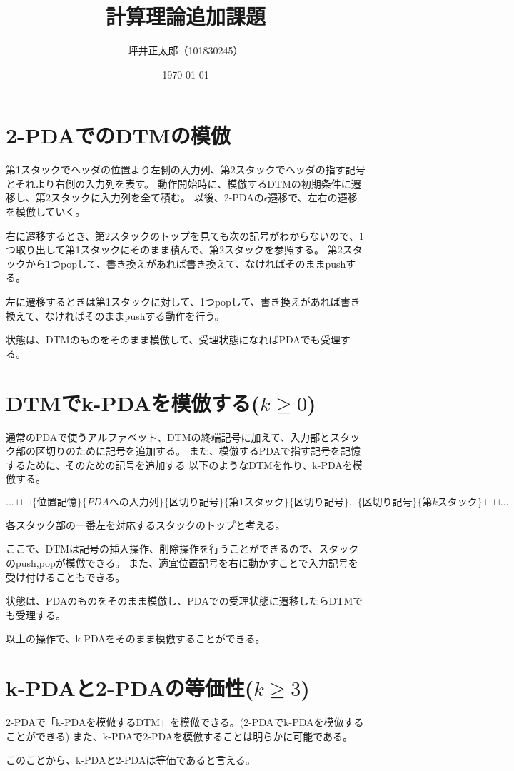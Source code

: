 \documentclass[a4paper,10pt]{jsarticle}
\begin{document}
\title{計算理論追加課題}
\author{坪井正太郎（101830245）}
\date{\today}
\maketitle
\section{2-PDAでのDTMの模倣}
第1スタックでヘッダの位置より左側の入力列、第2スタックでヘッダの指す記号とそれより右側の入力列を表す。
動作開始時に、模倣するDTMの初期条件に遷移し、第2スタックに入力列を全て積む。
以後、2-PDAの$\epsilon$遷移で、左右の遷移を模倣していく。

右に遷移するとき、第2スタックのトップを見ても次の記号がわからないので、1つ取り出して第1スタックにそのまま積んで、第2スタックを参照する。
第2スタックから1つpopして、書き換えがあれば書き換えて、なければそのままpushする。

左に遷移するときは第1スタックに対して、1つpopして、書き換えがあれば書き換えて、なければそのままpushする動作を行う。

状態は、DTMのものをそのまま模倣して、受理状態になればPDAでも受理する。

\section{DTMでk-PDAを模倣する($k\ge 0$)}
通常のPDAで使うアルファベット、DTMの終端記号に加えて、入力部とスタック部の区切りのために記号を追加する。
また、模倣するPDAで指す記号を記憶するために、そのための記号を追加する
以下のようなDTMを作り、k-PDAを模倣する。

\[...\sqcup \sqcup \{位置記憶\}\{PDAへの入力列\}\{区切り記号\}\{第1スタック\}\{区切り記号\}...\{区切り記号\}\{第kスタック\}\sqcup \sqcup ...\]

各スタック部の一番左を対応するスタックのトップと考える。

ここで、DTMは記号の挿入操作、削除操作を行うことができるので、スタックのpush,popが模倣できる。
また、適宜位置記号を右に動かすことで入力記号を受け付けることもできる。

状態は、PDAのものをそのまま模倣し、PDAでの受理状態に遷移したらDTMでも受理する。\

以上の操作で、k-PDAをそのまま模倣することができる。

\section{k-PDAと2-PDAの等価性($k\ge 3$)}
2-PDAで「k-PDAを模倣するDTM」を模倣できる。(2-PDAでk-PDAを模倣することができる)
また、k-PDAで2-PDAを模倣することは明らかに可能である。

このことから、k-PDAと2-PDAは等価であると言える。
\end{document}
